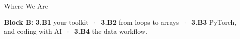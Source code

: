 

\graphicspath{{./figures/}}





\makedecktitle

\begin{frame}{Where We Are}
\vspace{-1mm}
\begin{center}
\small \textbf{Block B:} \textbf{3.B1} your toolkit $\;\cdot\;$ \textbf{3.B2} from loops to arrays $\;\cdot\;$ \textbf{3.B3} PyTorch, and coding with AI $\;\cdot\;$ \textbf{3.B4} the data workflow.
\end{center}
\end{frame}

